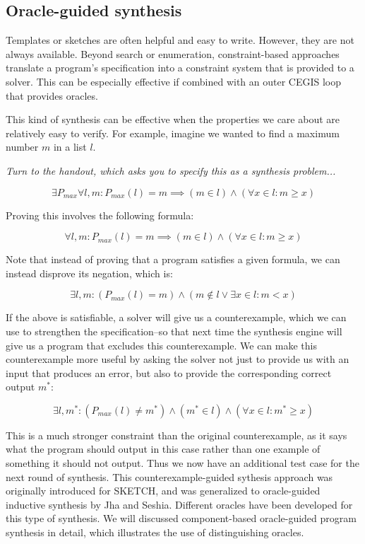 \documentclass[11pt]{article}
\begin{document}
\subsection{Oracle-guided synthesis}

Templates or sketches are often helpful and easy to write.  However, they are
not always available.  
Beyond search or enumeration, constraint-based approaches translate a program's
specification into a constraint system that is provided to a solver.  This can
be especially effective if combined with an outer CEGIS loop that provides
oracles.  

This kind of synthesis can be effective when the properties we care about are
relatively easy to verify.  For example, imagine we wanted to find a maximum
number $m$ in a list $l$.

\vspace{1em}
\noindent\emph{Turn to the handout, which asks you to specify this as a synthesis problem...}


 \[
 \exists P_{max} \forall l, m : P_{max}(l) = m \implies ( m \in l ) \wedge
 (\forall x \in l : m \ge x ) \]

 Proving this involves the following formula:

 \[
 \forall l, m : P_{max}(l) = m \implies (m \in l) \wedge (\forall x \in l : m \ge
 x)
 \]

Note that instead of proving that a program satisfies a given formula, we can
instead disprove its negation, which is: 

\[
\exists l, m : ( P_{max} (l)  = m ) \wedge ( m \notin l \vee \exists x \in l : m <
x)
\]

If the above is satisfiable, a solver will give us a counterexample, which we
can use to strengthen the specification--so that next time the synthesis engine
will give us a program that excludes this counterexample.  We can make this
counterexample more useful by asking the solver not just to provide us with an input
that produces an error, but also to provide the corresponding
correct output $m^*$:

\[
\exists l, m^* : (P_{max}(l) \neq m^* ) \wedge (m^* \in l ) \wedge (\forall x
\in l : m^* \ge x)
\]

This is a much stronger constraint than the original counterexample, as it says
what the program should output in this case rather than one example of something it
should not output.  Thus we now have an additional test case for the next round of
synthesis.  This counterexample-guided sythesis
approach was originally introduced for SKETCH, and was generalized to oracle-guided
inductive synthesis by Jha and Seshia.  Different oracles have been developed
for this type of synthesis.  We will discussed component-based oracle-guided
program synthesis in detail, which illustrates the use of distinguishing
oracles.
\end{document}
